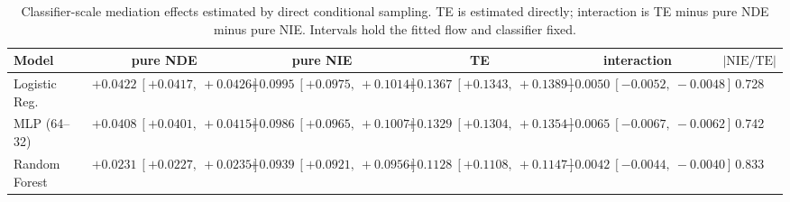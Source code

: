 \begin{table}[htbp]
  \centering
  \caption{Classifier-scale mediation effects estimated by direct conditional sampling. TE is estimated directly; interaction is TE minus pure NDE minus pure NIE. Intervals hold the fitted flow and classifier fixed.}
  \label{tab:german_synth_m05_gap_overall}
  \begin{tabular}{lccccc}
    \toprule
    Model & pure NDE & pure NIE & TE & interaction & $|\mathrm{NIE}/\mathrm{TE}|$ \\
    \midrule
    Logistic Reg. & $+0.0422\ [+0.0417,\ +0.0426]$ & $+0.0995\ [+0.0975,\ +0.1014]$ & $+0.1367\ [+0.1343,\ +0.1389]$ & $-0.0050\ [-0.0052,\ -0.0048]$ & 0.728 \\
    MLP (64--32) & $+0.0408\ [+0.0401,\ +0.0415]$ & $+0.0986\ [+0.0965,\ +0.1007]$ & $+0.1329\ [+0.1304,\ +0.1354]$ & $-0.0065\ [-0.0067,\ -0.0062]$ & 0.742 \\
    Random Forest & $+0.0231\ [+0.0227,\ +0.0235]$ & $+0.0939\ [+0.0921,\ +0.0956]$ & $+0.1128\ [+0.1108,\ +0.1147]$ & $-0.0042\ [-0.0044,\ -0.0040]$ & 0.833 \\
    \bottomrule
  \end{tabular}
\end{table}
